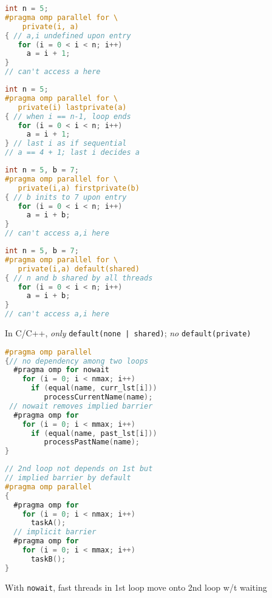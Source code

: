 \begin{minipage}{0.5\linewidth}
\begin{lstlisting}[language=C,xrightmargin=3pt]
int n = 5;
#pragma omp parallel for \
    private(i, a)
{ // a,i undefined upon entry
   for (i = 0 < i < n; i++)
     a = i + 1;
}
// can't access a here
\end{lstlisting}
\end{minipage}
\begin{minipage}{0.5\linewidth}
\begin{lstlisting}[language=C,xleftmargin=3pt]
int n = 5;
#pragma omp parallel for \
   private(i) lastprivate(a)
{ // when i == n-1, loop ends
   for (i = 0 < i < n; i++)
     a = i + 1;
} // last i as if sequential
// a == 4 + 1; last i decides a
\end{lstlisting}
\end{minipage}
\begin{minipage}{0.5\linewidth}
\begin{lstlisting}[language=C,xrightmargin=3pt]
int n = 5, b = 7;
#pragma omp parallel for \
   private(i,a) firstprivate(b)
{ // b inits to 7 upon entry
   for (i = 0 < i < n; i++)
     a = i + b;
}
// can't access a,i here
\end{lstlisting}
\end{minipage}
\begin{minipage}{0.5\linewidth}
\begin{lstlisting}[language=C,xleftmargin=3pt]
int n = 5, b = 7;
#pragma omp parallel for \
   private(i,a) default(shared)
{ // n and b shared by all threads
   for (i = 0 < i < n; i++)
     a = i + b;
}
// can't access a,i here
\end{lstlisting}
\end{minipage}
 In C/C++, \emph{only} \texttt{default(none | shared)}; \emph{no} \texttt{default(private)}

\begin{minipage}{0.5\linewidth}
\begin{lstlisting}[language=C,xrightmargin=3pt]
#pragma omp parallel
{// no dependency among two loops
  #pragma omp for nowait
    for (i = 0; i < nmax; i++)
      if (equal(name, curr_lst[i]))
         processCurrentName(name);
 // nowait removes implied barrier
  #pragma omp for
    for (i = 0; i < mmax; i++)
      if (equal(name, past_lst[i]))
         processPastName(name);
}
\end{lstlisting}
\end{minipage}
\begin{minipage}{0.5\linewidth}
\begin{lstlisting}[language=C,xleftmargin=3pt]
// 2nd loop not depends on 1st but
// implied barrier by default
#pragma omp parallel
{
  #pragma omp for
    for (i = 0; i < nmax; i++)
      taskA();
  // implicit barrier
  #pragma omp for
    for (i = 0; i < mmax; i++)
      taskB();
}
\end{lstlisting}
\end{minipage}
With \texttt{nowait}, fast threads in 1st loop move onto 2nd loop w/t waiting
